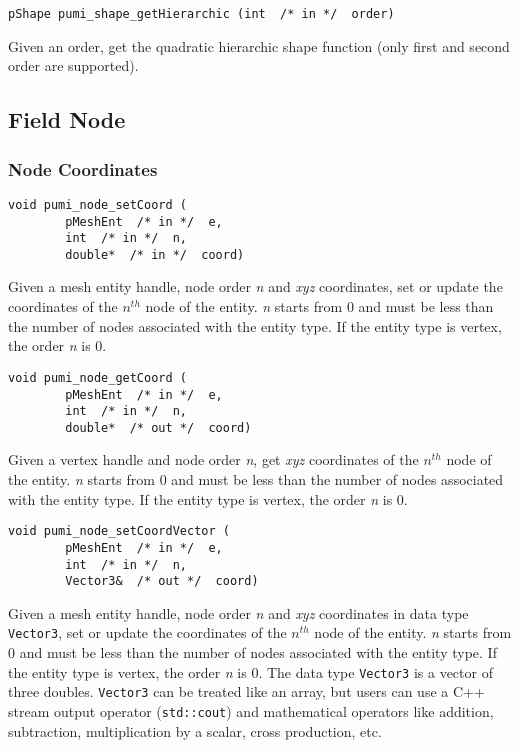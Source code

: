 \begin{verbatim}
pShape pumi_shape_getHierarchic (int  /* in */  order)
\end{verbatim}\vspace{-.5cm}\hspace{1cm}
Given an order, get the quadratic hierarchic shape function (only first and second order are supported).

\subsection{Field Node}
\subsubsection{Node Coordinates}
\begin{verbatim}
void pumi_node_setCoord (
        pMeshEnt  /* in */  e,
        int  /* in */  n,
        double*  /* in */  coord)
\end{verbatim}\vspace{-.5cm}\hspace{1cm}
        Given a mesh entity handle, node order \emph{n} and \emph{xyz} coordinates, set or update the coordinates of the $n^{th}$ node of the entity. \emph{n} starts from 0 and must be less than the number of nodes associated with the entity type. If the entity type is vertex, the order \emph{n} is 0.

\begin{verbatim}
void pumi_node_getCoord (
        pMeshEnt  /* in */  e,
        int  /* in */  n,
        double*  /* out */  coord)
\end{verbatim}\vspace{-.5cm}\hspace{1cm}
	Given a vertex handle and node order \emph{n}, get \emph{xyz} coordinates of the $n^{th}$  node of the entity. \emph{n} starts from $0$ and must be less than the number of nodes associated with the entity type. If the entity type is vertex, the order \emph{n} is $0$.

\begin{verbatim}
void pumi_node_setCoordVector (
        pMeshEnt  /* in */  e,
        int  /* in */  n,
        Vector3&  /* out */  coord)
\end{verbatim}\vspace{-.5cm}\hspace{1cm}
        Given a mesh entity handle, node order \emph{n} and \emph{xyz} coordinates in data type \texttt{Vector3}, set or update the coordinates of the $n^{th}$ node of the entity. \emph{n} starts from 0 and must be less than the number of nodes associated with the entity type. If the entity type is vertex, the order \emph{n} is $0$. The data type \texttt{Vector3} is a vector of three doubles. \texttt{Vector3} can be treated like an array, but users can use a C++ stream output operator (\texttt{std::cout}) and mathematical operators like addition, subtraction, multiplication by a scalar, cross production, etc. 

